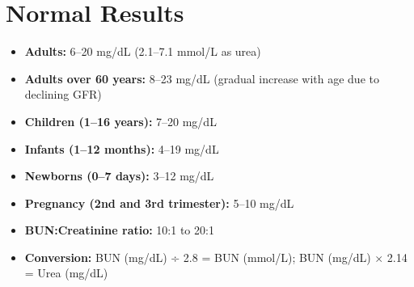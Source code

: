 \section*{Normal Results}
\begin{itemize}
  \item \textbf{Adults:} 6--20 mg/dL (2.1--7.1 mmol/L as urea)
  \item \textbf{Adults over 60 years:} 8--23 mg/dL (gradual increase with age due to declining GFR)
  \item \textbf{Children (1--16 years):} 7--20 mg/dL
  \item \textbf{Infants (1--12 months):} 4--19 mg/dL
  \item \textbf{Newborns (0--7 days):} 3--12 mg/dL
  \item \textbf{Pregnancy (2nd and 3rd trimester):} 5--10 mg/dL
  \item \textbf{BUN:Creatinine ratio:} 10:1 to 20:1
  \item \textbf{Conversion:} BUN (mg/dL) ÷ 2.8 = BUN (mmol/L); BUN (mg/dL) $\times$ 2.14 = Urea (mg/dL)
\end{itemize}


